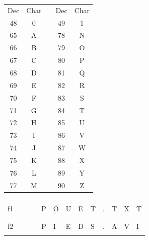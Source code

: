 \documentclass[11pt,a4paper]{article}
\begin{document}
\begin{table}[ht!]
  \centering
  \begin{minipage}{0.3\textwidth}
    \centering

\begin{tabular}{ |c|c| m{0.3cm} |c|c| }
\cline{1-2} \cline{4-5}
Dec & Char &   & Dec & Char \\
\cline{1-2} \cline{4-5}
48 & 0 &  & 49 & 1 \\
\cline{1-2} \cline{4-5}
65 & A &  & 78 & N \\
66 & B &  & 79 & O \\
67 & C &  & 80 & P \\
68 & D &  & 81 & Q \\
69 & E &  & 82 & R \\
70 & F &  & 83 & S \\
71 & G &  & 84 & T \\
72 & H &  & 85 & U \\
73 & I &  & 86 & V \\
74 & J &  & 87 & W \\
75 & K &  & 88 & X \\
76 & L &  & 89 & Y \\
77 & M &  & 90 & Z \\
\cline{1-2} \cline{4-5}
\end{tabular}

  \end{minipage}
  \hfillx
  \begin{minipage}{0.65\textwidth}
    \centering

\begin{tabular}{ c   | m{0.45cm} | m{0.45cm} | m{0.45cm} | m{0.45cm} | m{0.45cm} | m{0.45cm} | m{0.45cm} | m{0.45cm} | c | m{0.45cm} | m{0.45cm} | m{0.45cm} | }
\cline{2-9} \cline{11-13}
 & & & & & & & & &   & & & \\
f1   & & & &  P  &  O  &  U  &  E  &  T  &  .  &  T  &  X  &  T  \\
 & & & & & & & & &   & & & \\
\cline{2-9} \cline{11-13}
 & & & & & & & & &   & & & \\
f2   & & & &  P  &  I  &  E  &  D  &  S  &  .  &  A  &  V  &  I  \\
 & & & & & & & & &   & & & \\
\cline{2-9} \cline{11-13}
\end{tabular}

  \end{minipage}
\end{table}
\end{document}
